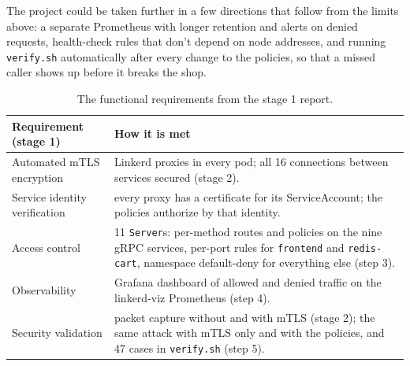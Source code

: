 \documentclass[12pt,a4paper]{article}
\begin{document}
The project could be taken further in a few directions that follow from the
limits above: a separate Prometheus with longer retention and alerts on
denied requests, health-check rules that don't depend on node addresses, and
running \texttt{verify.sh} automatically after every change to the policies,
so that a missed caller shows up before it breaks the shop.


\begin{table}[H]
  \centering
  \footnotesize
  \begin{tabular}{p{5.2cm}p{8.8cm}}
    \toprule
    Requirement (stage 1) & How it is met \\
    \midrule
    Automated mTLS encryption & Linkerd proxies in every pod; all 16
      connections between services secured (stage 2). \\
    Service identity verification & every proxy has a certificate for its
      ServiceAccount; the policies authorize by that identity. \\
    Access control & 11 \texttt{Server}s: per-method routes and policies on
      the nine gRPC services, per-port rules for \texttt{frontend} and
      \texttt{redis-cart}, namespace default-deny for everything else (step 3). \\
    Observability & Grafana dashboard of allowed and denied traffic on the
      linkerd-viz Prometheus (step 4). \\
    Security validation & packet capture without and with mTLS (stage 2); the
      same attack with mTLS only and with the policies, and 47 cases in
      \texttt{verify.sh} (step 5). \\
    \bottomrule
  \end{tabular}
  \caption{The functional requirements from the stage 1 report.}
\end{table}
\end{document}
